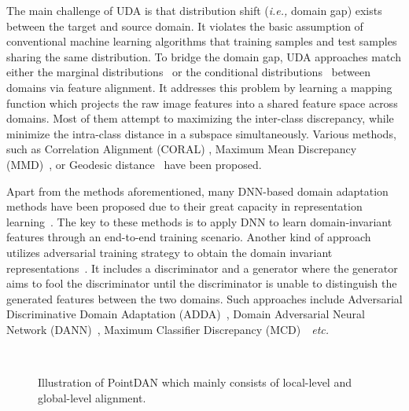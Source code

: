 \documentclass{article}
\begin{document}
The main challenge of UDA is that distribution shift (\textit{i.e.,} domain gap) exists between the target and source domain. It violates the basic assumption of conventional machine learning algorithms that training samples and test samples sharing the same distribution. To bridge the domain gap, UDA approaches match either the marginal distributions~\cite{sugiyama2008direct,pan2010domain,gong2013connecting,Seg_Lichen_TIP18} or the conditional distributions~\cite{zhang2013domain,courty2017joint} between domains via feature alignment. It addresses this problem by learning a mapping function  which projects the raw image features into a shared feature space across domains. Most of them attempt to maximizing the inter-class discrepancy, while minimize the intra-class distance in a subspace simultaneously. Various methods, such as Correlation Alignment (CORAL) \cite{sun2016deep}, Maximum Mean Discrepancy (MMD)~\cite{borgwardt2006integrating,long2013transfer}, or Geodesic distance~\cite{gopalan2011domain} have been proposed. 



Apart from the methods aforementioned, many DNN-based domain adaptation methods have been proposed due to their great capacity in representation learning~\cite{he2016deep,simonyan2014very,krizhevsky2012imagenet}. The key to these methods is to apply DNN to learn domain-invariant features through an end-to-end training scenario. Another kind of approach utilizes adversarial training strategy to obtain the domain invariant representations~\cite{ganin2014unsupervised,tzeng2017adversarial,Dong_2019_ICCV, Qin_2019_ICCV_Workshops}. It includes a discriminator and a generator where the generator aims to fool the discriminator until the discriminator is unable to distinguish the generated features between the two domains. Such approaches include Adversarial Discriminative Domain Adaptation (ADDA)~\cite{tzeng2017adversarial}, Domain Adversarial Neural Network (DANN)~\cite{ganin2014unsupervised}, Maximum Classifier Discrepancy (MCD)~\cite{saito2018maximum}~\textit{etc.} 

\label{method}
\begin{figure*}[t]
\centering
{}\\

\caption{Illustration of PointDAN which mainly consists of local-level and global-level alignment. }\label{f2}

\end{figure*}
\end{document}
